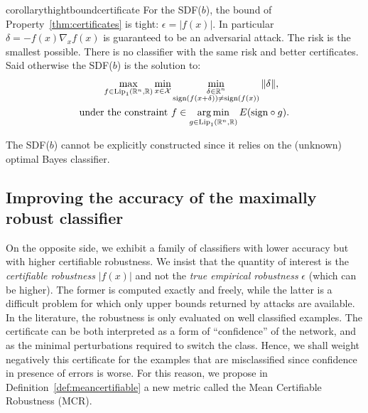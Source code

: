       
    \begin{restatable}{corollary}{thightboundcertificate}\label{thm:thightboundcertificate}
        For the SDF($b$), the bound of Property~\ref{thm:certificates} is tight: $\epsilon=|f(x)|$. In particular $\delta=-f(x)\nabla_xf(x)$ is guaranteed to be an adversarial attack. The risk is the smallest possible. There is no classifier with the same risk and better certificates. Said otherwise the SDF($b$) is the solution to:
        \begin{equation}
            \begin{aligned}
                \max_{f\in\text{Lip}_1(\mathbb{R}^n,\mathbb{R})}\min_{x\in\mathcal{X}}&\min_{\substack{\delta\in\mathbb{R}^n\\ \text{sign}{(f(x+\delta))}\neq \text{sign}{(f(x))}}} \|\delta\|,\\
                \textrm{under the constraint } &  f\in\operatorname*{arg\,min}_{g\in\text{Lip}_1(\mathbb{R}^n,\mathbb{R})}E(\text{sign}\circ g).\\
            \end{aligned}
        \end{equation}
    \end{restatable} %
    
    The SDF($b$) cannot be explicitly constructed since it relies on the (unknown) optimal Bayes classifier. %
    
\subsection{Improving the accuracy of the maximally robust classifier}
    \label{max_rob}
    
    On the opposite side, we exhibit a family of classifiers with lower accuracy but with higher certifiable robustness. We insist that the quantity of interest is the \textit{certifiable robustness} $|f(x)|$ and not the \textit{true empirical robustness} $\epsilon$ (which can be higher). The former is computed exactly and freely, while the latter is a difficult problem for which only upper bounds returned by attacks are available. In the literature, the robustness is only evaluated on well classified examples. The certificate can be both interpreted as a form of ``confidence'' of the network, and as the minimal perturbations required to switch the class. Hence, we shall weight negatively this certificate for the examples that are misclassified since confidence in presence of errors is worse. For this reason, we propose in Definition~\ref{def:meancertifiable} a new metric called the Mean Certifiable Robustness (MCR).
      
